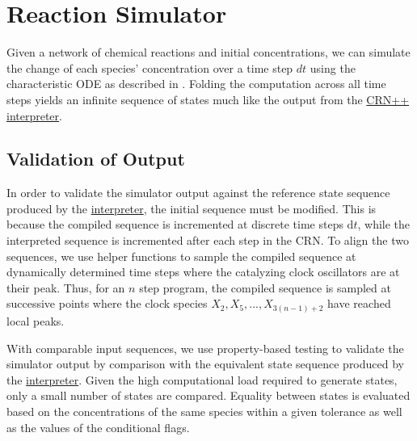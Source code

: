 \section{Reaction Simulator} %
Given a network of chemical reactions and initial concentrations, we can simulate the change of each species' concentration over a time step $dt$ using the characteristic ODE as described in \cite{soloveichik2018a}. Folding the computation across all time steps yields an infinite sequence of states much like the output from the \hyperref[sec:interpreter]{CRN++ interpreter}.

\subsection{Validation of Output}
In order to validate the simulator output against the reference state sequence produced by the \hyperref[sec:interpreter]{interpreter}, the initial sequence must be modified. This is because the compiled sequence is incremented at discrete time steps $\mathrm{d}t$, while the interpreted sequence is incremented after each step in the CRN. To align the two sequences, we use helper functions to sample the compiled sequence at dynamically determined time steps where the catalyzing clock oscillators are at their peak. Thus, for an $n$ step program, the compiled sequence is sampled at successive points where the clock species $X_2, X_5, ..., X_{3 (n-1) +2}$ have reached local peaks. 

With comparable input sequences, we use property-based testing to validate the simulator output by comparison with the equivalent state sequence produced by the \hyperref[sec:interpreter]{interpreter}. Given the high computational load required to generate states, only a small number of states are compared. Equality between states is evaluated based on the concentrations of the same species within a given tolerance as well as the values of the conditional flags.  
